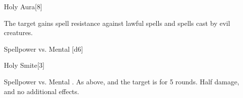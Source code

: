 \begin{spellsection}{Holy Aura}[8]
    \begin{spellheader}
    \end{spellheader}
    \begin{spellcontent}
        \begin{spelltargetinginfo}
        \end{spelltargetinginfo}
        \begin{spelleffects}
            \spelleffect The target gains spell resistance against lawful spells and spells cast by evil creatures.
            \spelldur \durshort \dismissable
        \end{spelleffects}
    \end{spellcontent}
    \begin{spellsubcontent}
        \begin{spelltargetinginfo}
        \end{spelltargetinginfo}
        \begin{spelleffects}
            \begin{spellattack}{Spellpower vs. Mental}
                \spellsuccess {}[d6]
            \end{spellattack}
        \end{spelleffects}
    \end{spellsubcontent}
    \begin{spellfooter}
        \miscastexplode
    \end{spellfooter}
\end{spellsection}

\begin{spellsection}{Holy Smite}[3]
    \begin{spellheader}
    \end{spellheader}
    \begin{spellcontent}
        \begin{spelltargetinginfo}
        \end{spelltargetinginfo}
        \begin{spelleffects}
            \begin{spellattack}{Spellpower vs. Mental}
                \spellsuccess {}.
                \spellcritical As above, and the target is \dazed for 5 rounds.
                \spellfailure Half damage, and no additional effects.
            \end{spellattack}
        \end{spelleffects}
    \end{spellcontent}
    \begin{spellfooter}
        \miscastrandom
    \end{spellfooter}
\end{spellsection}

